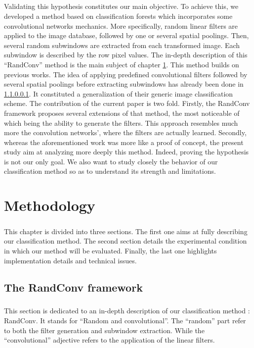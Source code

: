 \documentclass[a4paper]{report}
\begin{document}
\paragraph{}
Validating this hypothesis constitutes our main objective. To achieve this, we developed a method based on classification forests which incorporates some convolutional networks mechanics. More specifically, random linear filters are applied to the image database, followed by one or several spatial poolings. Then, several random subwindows are extracted from each transformed image. Each subwindow is described by the row pixel values.
The in-depth description of this ``RandConv'' method is the main subject of chapter \ref{chap:methodo}.
	This method builds on previous works. The idea of applying predefined convolutional filters followed by several spatial poolings before extracting subwindows has already been done in \ref{}. It constituted a generalization of their generic image classification scheme. The contribution of the current paper is two fold. 
	Firstly, the RandConv framework proposes several extensions of that method, the most noticeable of which being the ability to generate the filters. This approach resembles much more the convolution networks', where the filters are actually learned.
	Secondly, whereas the aforementioned work was more like a proof of concept, the present study aim at analyzing more deeply this method. Indeed, proving the hypothesis is not our only goal. We also want to study closely the behavior of our classification method so as to understand its strength and limitations.

\chapter{Methodology}
\label{chap:methodo}
\paragraph{}
This chapter is divided into three sections. The first one aims at fully describing our classification method. The second section details the experimental condition in which our method will be evaluated. Finally, the last one highlights implementation details and technical issues.
	\section{The RandConv framework}
	\paragraph{}
	This section is dedicated to an in-depth description of our classification method : RandConv. It stands for ``Random and 	convolutional''. The ``random'' part refer to both the filter generation and subwindow extraction. While the ``convolutional'' adjective refers to the application of the linear filters. 
\end{document}
